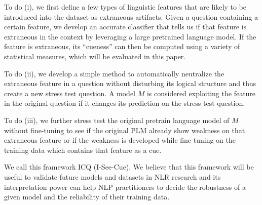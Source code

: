 To do (i), we first define a few types of linguistic features that are likely to be
introduced into the dataset as extraneous artifacts.
Given a question containing a certain feature, we develop an accurate classifier
that tells us if that feature is extraneous in the context by leveraging
a large pretrained language model.
If the feature is extraneous, its ``cueness'' can then be computed using a variety of
statistical measures, which will be evaluated in this paper. 

To do (ii), we develop a simple method to automatically neutralize the 
extraneous feature in a question without disturbing its logical
structure and thus create a new stress test question. A model $M$ is
considered exploiting the feature in the original question
if it changes its prediction on the stress test question.

To do (iii), we further stress test the original pretrain language model of $M$ 
without fine-tuning to see if the original PLM already show weakness on
that extraneous feature or if the weakness is developed while fine-tuning
on the training data which contains that feature as a cue.

We call this framework ICQ (I-See-Cue). We believe that
this framework will be useful to validate future models and
datasets in NLR research and its interpretation power can help
NLP practitioners to decide the robustness of a given model and
the reliability of their training data. 


